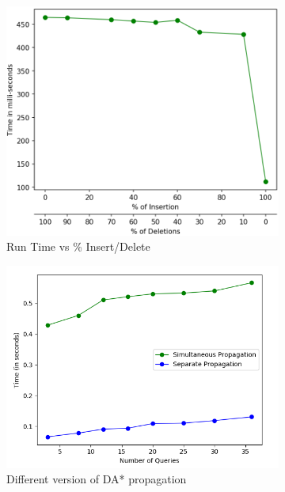 \documentclass[a4paper]{article}
\begin{document}
\begin{figure}[H]
    \centering
    \begin{subfigure}[b]{0.44\textwidth}
        \centering
        \includegraphics[width=\textwidth]{img/IDvK.png}
        \caption{Run Time vs \% Insert/Delete}
        \label{fig:runtime_ins_del}
    \end{subfigure}
     \hfill
    \begin{subfigure}[b]{0.50\textwidth}
        \centering
        \includegraphics[width=\textwidth]{img/propagation_method.png}
        \caption{Different version of DA* propagation}
        \label{fig:DA_version}
    \end{subfigure}
   \caption{}
    
\end{figure}
\end{document}
